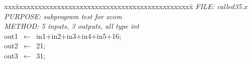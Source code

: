 \documentclass{report}
\begin{document}
\pagestyle{empty}
\begin{tabbing}
xxx\=xxxxxxxxxxxxxxxxxxxxxxxxxxxxxxxxxxxxxxxxxxxxxxx\=\kill
{\tt{}}{\em{} FILE:    called35.x
}\\
{\tt{}}{\em{} PURPOSE: subprogram test for xcom
}\\
{\tt{}}{\em{} METHOD:  5 inputs, 3 outputs, all type int
}\\
out1\ $\leftarrow$\ in1$+$in2$+$in3$+$in4$+$in5$+$16;\>\\
out2\ $\leftarrow$\ 21;\\
out3\ $\leftarrow$\ 31;\\
\end{tabbing}
\end{document}
